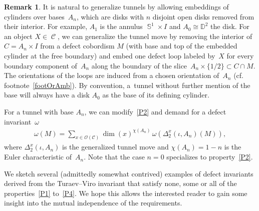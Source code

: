 \documentclass[10pt,a4paper]{amsart}
\DeclareMathOperator{\Sp}{\mathbb{S}}
\DeclareMathOperator{\calc}{\mathcal{C}}
\numberwithin{equation}{section}
\theoremstyle{definition}
\newtheorem{Remark}[Remark]{Remark}
\begin{document}
\begin{Remark} \label{remGenTun}
It is natural to generalize tunnels by allowing embeddings of cylinders over bases~$A_n$, which are disks with $n$ disjoint open disks removed from their interior. For example, $A_1$ is the annulus $\Sp^1 \times I$ and $A_0 \cong \mathbb{D}^2$ the disk. For an object $X \in \calc$, we can generalize the tunnel move by removing the interior of $C = A_n \times I$ from a defect cobordism $M$ (with base and top of the embedded cylinder at the free boundary) and embed one defect loop labeled by~$X$ for every boundary component of~$A_n$ along the boundary of the slice~$A_n \times \{1/2\} \subset C \cap M$. The orientations of the loops are induced from a chosen orientation of~$A_n$ (cf. footnote~\ref{footOrAmb}). By convention, a~tunnel without further mention of the base will always have a disk $A_0$ as the base of its defining cylinder.

For a tunnel with base $A_n$, we can modify~\ref{P2} and demand for a defect invariant~$\omega$
\begin{align}\label{eqGenTun}
\omega(M) = \sum_{x \in \mathcal{O}(\mathcal{C})}\dim(x)^{\chi(A_n)} \, \omega(\Delta_2^x(\iota, A_n)(M)),
 \end{align}
 where $\Delta_2^x(\iota, A_n)$ is the generalized tunnel move and $\chi(A_n) = 1-n$ is the Euler characteristic of~$A_n$. Note that the case $n = 0$ specializes to property~\ref{P2}.
\end{Remark}
We sketch several (admittedly somewhat contrived) examples of defect invariants derived from the Turaev--Viro invariant that satisfy none, some or all of the properties~\ref{P1} to~\ref{P4}. We hope this allows the interested reader to gain some insight into the mutual independence of the requirements.
\end{document}
